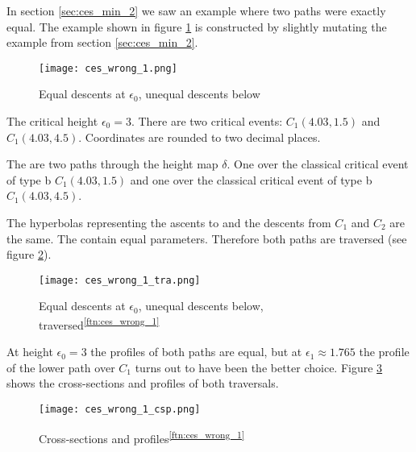 In section \ref{sec:ces_min_2} we saw an example where two paths were exactly equal. The example shown in figure \ref{fig:ces_wrong_1} is constructed by slightly mutating the example from section \ref{sec:ces_min_2}.

\begin{figure}[H]
	\centering
    
    \texttt{[image: ces\_wrong\_1.png]}
		
	\caption{Equal descents at $\epsilon_0$, unequal descents below\protect\footnotemark}
    \label{fig:ces_wrong_1}
\end{figure}

The critical height $\epsilon_0 = 3$. There are two critical events: $C_1(4.03, 1.5)$ and $C_1(4.03, 4.5)$. Coordinates are rounded to two decimal places.

The are two paths through the height map $\delta$. One over the classical critical event of type b $C_1(4.03, 1.5)$ and one over the classical critical event of type b $C_1(4.03, 4.5)$.

The hyperbolas representing the ascents to and the descents from $C_1$ and $C_2$ are the same. The contain equal parameters. Therefore both paths are traversed (see figure \ref{fig:ces_wrong_1_tra}).

\begin{figure}[H]
	\centering
    
    \texttt{[image: ces\_wrong\_1\_tra.png]}
		
	\caption{Equal descents at $\epsilon_0$, unequal descents below, traversed\textsuperscript{\ref{ftn:ces_wrong_1}}}
    \label{fig:ces_wrong_1_tra}
\end{figure}

At height $\epsilon_0 = 3$ the profiles of both paths are equal, but at $\epsilon_1 \approx 1.765$ the profile of the lower path over $C_1$ turns out to have been the better choice. Figure \ref{fig:ces_wrong_1_csp} shows the cross-sections and profiles of both traversals.

\begin{figure}[H]
	\centering
    
    \texttt{[image: ces\_wrong\_1\_csp.png]}
		
	\caption{Cross-sections and profiles\textsuperscript{\ref{ftn:ces_wrong_1}}}
    \label{fig:ces_wrong_1_csp}
\end{figure}

